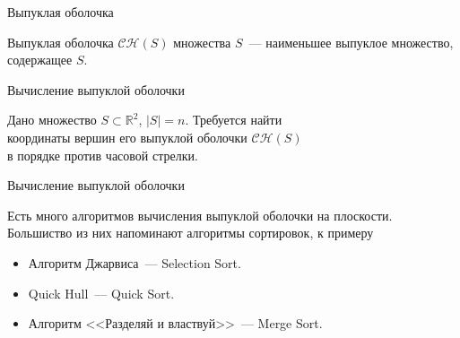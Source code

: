     \begin{frame}{Выпуклая оболочка}
        
        \vspace{3mm}
        \begin{defn}

            \alert{Выпуклая оболочка $\mathcal{C}\mathcal{H}(S)$} множества $S$~--- наименьшее выпуклое множество, содержащее $S$.

        \end{defn}

        \begin{center}
        \end{center}

    \end{frame}

    \begin{frame}{Вычисление выпуклой оболочки}

        \begin{task}
		Дано множество $S \subset \mathbb{R}^2$, $|S| = n$. Требуется найти \\
		координаты вершин его выпуклой оболочки $\mathcal{C}\mathcal{H}(S)$ \\
		в порядке против часовой стрелки.
        \end{task}

    \end{frame}

    \begin{frame}{Вычисление выпуклой оболочки}

        Есть много алгоритмов вычисления выпуклой оболочки на плоскости.
        Большиство из них напоминают алгоритмы сортировок, к примеру

        \begin{itemize}
            \item Алгоритм Джарвиса~--- Selection Sort.
            \item Quick Hull~--- Quick Sort.
            \item Алгоритм <<Разделяй и властвуй>>~--- Merge Sort.
        \end{itemize}

    \end{frame}

